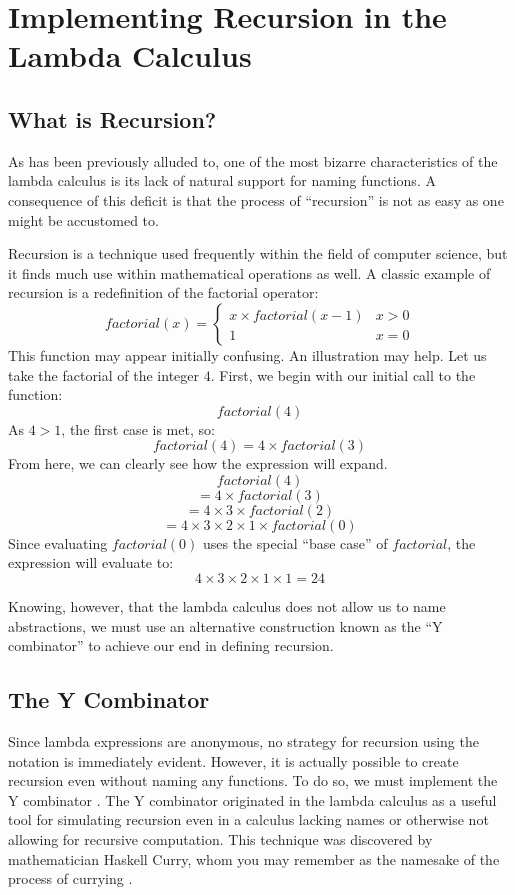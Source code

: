 \documentclass[twocolumn,titlepage,12pt]{article}
\begin{document}
\section{Implementing Recursion in the Lambda Calculus}
\subsection{What is Recursion?}
As has been previously alluded to, one of the most bizarre characteristics of the lambda calculus is its lack of natural support for naming functions. A consequence of this deficit is that the process of ``recursion'' is not as easy as one might be accustomed to.

Recursion is a technique used frequently within the field of computer science, but it finds much use within mathematical operations as well. A classic example of recursion is a redefinition of the factorial operator:
\[
factorial(x)=
\begin{cases}
    x\times factorial(x-1) & x>0 \\
    1 & x=0
\end{cases}
\]
This function may appear initially confusing. An illustration may help. Let us take the factorial of the integer $4$. First, we begin with our initial call to the function:
$$factorial(4)$$
As $4>1$, the first case is met, so:
$$factorial(4)=4\times factorial(3)$$
From here, we can clearly see how the expression will expand.
$$factorial(4)$$
$$=4\times factorial(3)$$
$$=4\times 3\times factorial(2)$$
$$=4\times 3\times 2\times 1\times factorial(0)$$
Since evaluating $factorial(0)$ uses the special ``base case'' of $factorial$, the expression will evaluate to:
$$4\times 3\times 2\times 1\times 1=24$$

Knowing, however, that the lambda calculus does not allow us to name abstractions, we must use an alternative construction known as the ``Y combinator'' to achieve our end in defining recursion.

\subsection{The Y Combinator}
Since lambda expressions are anonymous, no strategy for recursion using the notation is immediately evident. However, it is actually possible to create recursion even without naming any functions. To do so, we must implement the Y combinator \cite{ycombmedium}. The Y combinator originated in the lambda calculus as a useful tool for simulating recursion even in a calculus lacking names or otherwise not allowing for recursive computation. This technique was discovered by mathematician Haskell Curry, whom you may remember as the namesake of the process of currying \cite{compphileyc}.
\end{document}
